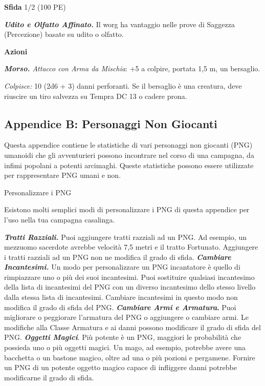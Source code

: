 \begin{multicols}{2}
\textbf{Sfida} 1/2 (100 PE)

\emph{\textbf{Udito e Olfatto Affinato.}} Il worg ha vantaggio nelle
prove di Saggezza (Percezione) basate su udito o olfatto.

\textbf{Azioni}

\emph{\textbf{Morso.} Attacco con Arma da Mischia}: +5 a colpire,
portata 1,5 m, un bersaglio.

\emph{Colpisce:} 10 (2d6 + 3) danni perforanti. Se il bersaglio è una
creatura, deve riuscire un tiro salvezza su Tempra DC 13 o cadere prona.

\pagebreak

\subsection{Appendice B: Personaggi Non Giocanti}

Questa appendice contiene le statistiche di vari personaggi non giocanti
(PNG) umanoidi che gli avventurieri possono incontrare nel corso di una
campagna, da infimi popolani a potenti arcimaghi. Queste statistiche
possono essere utilizzate per rappresentare PNG umani e non.

Personalizzare i PNG

Esistono molti semplici modi di personalizzare i PNG di questa appendice
per l'uso nella tua campagna casalinga.

\emph{\textbf{Tratti Razziali.}} Puoi aggiungere tratti razziali ad un
PNG. Ad esempio, un mezzuomo sacerdote avrebbe velocità 7,5 metri e il
tratto Fortunato. Aggiungere i tratti razziali ad un PNG non ne modifica
il grado di sfida. \emph{\textbf{Cambiare Incantesimi.}} Un modo per
personalizzare un PNG incantatore è quello di rimpiazzare uno o più dei
suoi incantesimi. Puoi sostituire qualsiasi incantesimo della lista di
incantesimi del PNG con un diverso incantesimo dello stesso livello
dalla stessa lista di incantesimi. Cambiare incantesimi in questo modo
non modifica il grado di sfida del PNG. \textbf{\emph{Cambiare Armi e
Armatura}.} Puoi migliorare o peggiorare l'armatura del PNG o aggiungere
o cambiare armi. Le modifiche alla Classe Armatura e ai danni possono
modificare il grado di sfida del PNG. \emph{\textbf{Oggetti Magici}}.
Più potente è un PNG, maggiori le probabilità che possieda uno o più
oggetti magici. Un mago, ad esempio, potrebbe avere una bacchetta o un
bastone magico, oltre ad una o più pozioni e pergamene. Fornire un PNG
di un potente oggetto magico capace di infliggere danni potrebbe
modificarne il grado di sfida.


\end{multicols}
